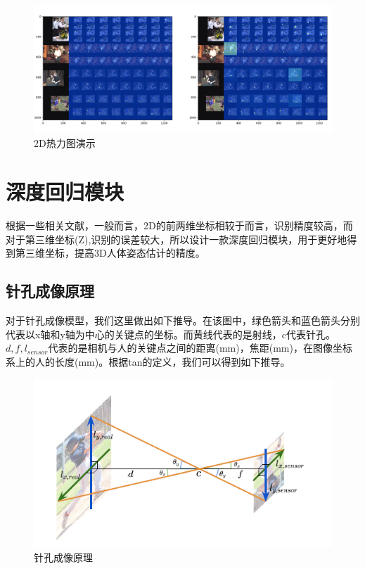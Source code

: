 \begin{figure}[h]
	\includegraphics[width=\textwidth]{pic/screenshot.png}
	\caption{2D热力图演示}
	\label{heatmap}
\end{figure}

\section{深度回归模块}

根据一些相关文献，一般而言，2D的前两维坐标相较于而言，识别精度较高，而对于第三维坐标(Z),识别的误差较大，所以设计一款深度回归模块，用于更好地得到第三维坐标，提高3D人体姿态估计的精度。

\subsection{针孔成像原理}

对于针孔成像模型，我们这里做出如下推导。在该图中，绿色箭头和蓝色箭头分别代表以x轴和y轴为中心的关键点的坐标。而黄线代表的是射线，c代表针孔。$d,f,l_{sensor}$代表的是相机与人的关键点之间的距离(mm)，焦距(mm)，在图像坐标系上的人的长度(mm)。根据tan的定义，我们可以得到如下推导。

\begin{figure}[h]
	\includegraphics{pic/depth.png}
	\caption{针孔成像原理}
	\label{depth}
\end{figure}

